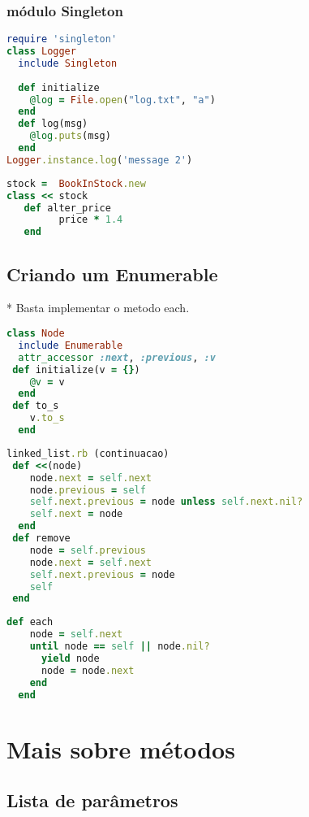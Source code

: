 \documentclass[serif,mathserif]{book}
\begin{document}
\subsection{módulo Singleton}
\begin{lstlisting}[language=ruby]
require 'singleton'
class Logger
  include Singleton
  
  def initialize
    @log = File.open("log.txt", "a")
  end
  def log(msg)
    @log.puts(msg)
  end
Logger.instance.log('message 2')
\end{lstlisting}

\begin{lstlisting}[language=ruby]
stock =  BookInStock.new
class << stock
   def alter_price
         price * 1.4
   end
\end{lstlisting}

\section{Criando um Enumerable}
  *  Basta implementar o metodo each. 
\begin{lstlisting}[language=ruby]
class Node
  include Enumerable 
  attr_accessor :next, :previous, :v
 def initialize(v = {})
    @v = v
  end
 def to_s
    v.to_s
  end
\end{lstlisting}

\begin{lstlisting}[language=ruby]
linked_list.rb (continuacao)
 def <<(node)
    node.next = self.next
    node.previous = self
    self.next.previous = node unless self.next.nil?
    self.next = node
  end
 def remove
    node = self.previous
    node.next = self.next
    self.next.previous = node
    self
 end
\end{lstlisting}

\begin{lstlisting}[language=ruby]
  def each
    node = self.next
    until node == self || node.nil?
      yield node
      node = node.next
    end
  end

\end{lstlisting}



\chapter{Mais sobre métodos}

\section{Lista de parâmetros}
\end{document}
